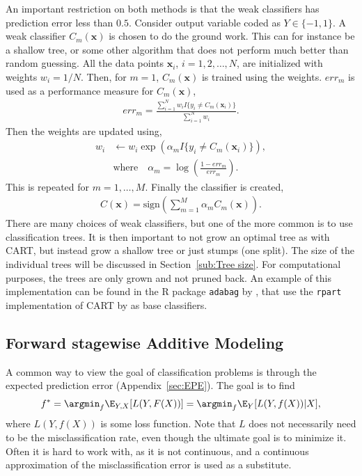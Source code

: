 An important restriction on both methods is that the weak classifiers has prediction error less than $0.5$.
Consider output variable coded as $Y \in \{-1, 1\}$. A weak classifier $C_m(\mathbf{x})$ is chosen to do the ground work. This can for instance be a shallow tree, or some other algorithm that does not perform much better than random guessing. All the data points $\mathbf{x}_i$, $i = 1, 2, \ldots, N$, are initialized with weights $w_i = 1/N$. Then, for $m = 1$, $C_m(\mathbf{x})$ is trained using the weights. $err_m$ is used as a performance measure for $C_m(\mathbf{x})$,
\begin{align}
  err_m =  \frac{\sum^{N}_{i=1} w_i I\{y_i \neq C_m(\mathbf{x}_i)\}}{\sum^{N}_{i=1} w_i}.
\end{align}
Then the weights are updated using, 
\begin{align}
  w_i &\leftarrow w_i \exp\left( \alpha_m I\{y_i \neq C_m(\mathbf{x}_i)\} \right), \\
  &\text{where} \quad \alpha_m = \log\left(  \frac{1-err_m}{err_m} \right).
\end{align}
This is repeated for $m = 1, \ldots, M$. Finally the classifier is created,
\begin{align}
  C( \mathbf{x}) = \text{sign}\left( \sum^{M}_{m=1} \alpha_m C_m(\mathbf{x}) \right).
\end{align}
There are many choices of weak classifiers, but one of the more common is to use classification trees. It is then important to not grow an optimal tree as with CART, but instead grow a shallow tree or just stumps (one split). The size of the individual trees will be discussed in Section~\ref{sub:Tree size}. For computational purposes, the trees are only grown and not pruned back.
An example of this implementation can be found in the R package \verb+adabag+ by \cite{adabag}, that use the \verb+rpart+ implementation of CART by \cite{rpart} as base classifiers.

\subsection{Forward stagewise Additive Modeling}
\label{sub:Forward stagewise additive modeling}
A common way to view the goal of classification problems is through the expected prediction error (Appendix~\ref{sec:EPE}). The goal is to find
\begin{align}
  \label{eq:fargmin} 
  f^* = \argmin_f \E_{Y, X}[L(Y,F(X))] = \argmin_f \E_Y [L(Y,f(X))|X] ,
\end{align}
where $L(Y, f(X))$ is some loss function. 
Note that $L$ does not necessarily need to be the misclassification rate, even though the ultimate goal is to minimize it.
Often it is hard to work with, as it is not continuous, and a continuous approximation  of the misclassification error is used as a substitute.

